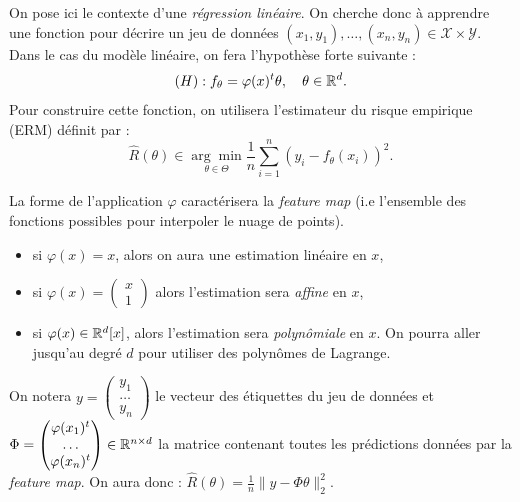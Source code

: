 
\minitoc 

On pose ici le contexte d'une \emph{régression linéaire}. On cherche donc à apprendre une fonction pour décrire un jeu de données $(x_1, y_1), \dots, (x_n, y_n) \in \mathcal{X} \times \mathcal{Y}$. Dans le cas du modèle linéaire, on fera l'hypothèse forte suivante : 
\begin{equation}
    (H) : f_\theta = \varphi(x)^t \theta, \quad \theta \in \mathbb{R}^d.
\end{equation} 
Pour construire cette fonction, on utilisera l'estimateur du risque empirique (ERM) définit par : 
\begin{equation}
    \hat{R}( \theta) \in \underset{ \theta \in \Theta}{\arg \min} \frac{1}{n} \sum_{i=1}^{n} \left(y_i - f_\theta(x_i)\right)^2. 
\end{equation}

\begin{example}
    La forme de l'application $ \varphi$ caractérisera la \emph{feature map} (i.e l'ensemble des fonctions possibles pour interpoler le nuage de points). 
    \begin{itemize}
        \item si $ \varphi(x) = x$, alors on aura une estimation linéaire en $x$, 
        \item si $ \varphi(x) = \begin{pmatrix} x \\ 1 \end{pmatrix}$ alors l'estimation sera \emph{affine} en $x$, 
        \item si $ \varphi(x) \in \mathbb{R}^d[x]$, alors l'estimation sera \emph{polynômiale} en $x$. On pourra aller jusqu'au degré $d$ pour utiliser des polynômes de Lagrange. 
    \end{itemize}
\end{example}

\begin{notation}
    On notera $y = \begin{pmatrix} y_1 \\ \dots \\ y_n \end{pmatrix}$ le vecteur des étiquettes du jeu de données et $ \Phi = \begin{pmatrix} \varphi(x_1)^t \\ \dots \\ \varphi(x_n)^t\end{pmatrix} \in \mathbb{R}^{n \times d}$ la matrice contenant toutes les prédictions données par la \emph{feature map}. 
    On aura donc : $ \hat{R}(\theta) = \frac{1}{n} \| y - \Phi \theta \|_2^2$. 
\end{notation}

